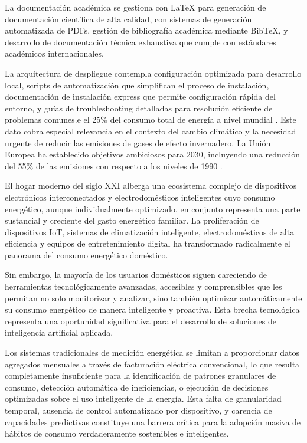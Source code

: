 La documentación académica se gestiona con LaTeX para generación de documentación científica de alta calidad, con sistemas de generación automatizada de PDFs, gestión de bibliografía académica mediante BibTeX, y desarrollo de documentación técnica exhaustiva que cumple con estándares académicos internacionales.

La arquitectura de despliegue contempla configuración optimizada para desarrollo local, scripts de automatización que simplifican el proceso de instalación, documentación de instalación express que permite configuración rápida del entorno, y guías de troubleshooting detalladas para resolución eficiente de problemas comunes.e el 25\% del consumo total de energía a nivel mundial \cite{iea2023}. Este dato cobra especial relevancia en el contexto del cambio climático y la necesidad urgente de reducir las emisiones de gases de efecto invernadero. La Unión Europea ha establecido objetivos ambiciosos para 2030, incluyendo una reducción del 55\% de las emisiones con respecto a los niveles de 1990 \cite{european_green_deal}.

El hogar moderno del siglo XXI alberga una ecosistema complejo de dispositivos electrónicos interconectados y electrodomésticos inteligentes cuyo consumo energético, aunque individualmente optimizado, en conjunto representa una parte sustancial y creciente del gasto energético familiar. La proliferación de dispositivos IoT, sistemas de climatización inteligente, electrodomésticos de alta eficiencia y equipos de entretenimiento digital ha transformado radicalmente el panorama del consumo energético doméstico.

Sin embargo, la mayoría de los usuarios domésticos siguen careciendo de herramientas tecnológicamente avanzadas, accesibles y comprensibles que les permitan no solo monitorizar y analizar, sino también optimizar automáticamente su consumo energético de manera inteligente y proactiva. Esta brecha tecnológica representa una oportunidad significativa para el desarrollo de soluciones de inteligencia artificial aplicada.

Los sistemas tradicionales de medición energética se limitan a proporcionar datos agregados mensuales a través de facturación eléctrica convencional, lo que resulta completamente insuficiente para la identificación de patrones granulares de consumo, detección automática de ineficiencias, o ejecución de decisiones optimizadas sobre el uso inteligente de la energía. Esta falta de granularidad temporal, ausencia de control automatizado por dispositivo, y carencia de capacidades predictivas constituye una barrera crítica para la adopción masiva de hábitos de consumo verdaderamente sostenibles e inteligentes.

